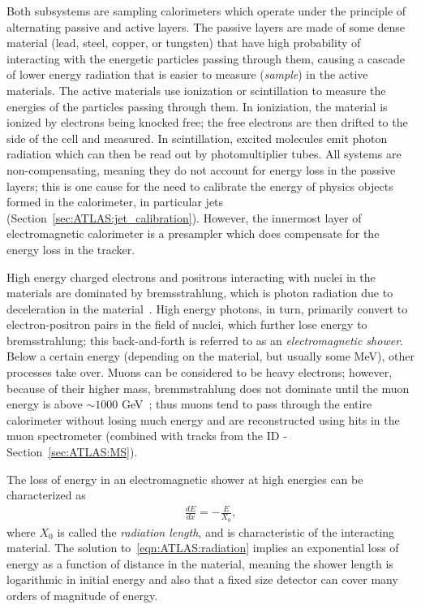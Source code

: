 Both subsystems are sampling calorimeters which operate under the principle of alternating passive and active layers.
The passive layers are made of some dense material (lead, steel, copper, or tungsten) that have high probability of interacting with the energetic particles passing through them, causing a cascade of lower energy radiation that is easier to measure (\textit{sample}) in the active materials.
The active materials use ionization or scintillation to measure the energies of the particles passing through them.
In ioniziation, the material is ionized by electrons being knocked free; the free electrons are then drifted to the side of the cell and measured.
In scintillation, excited molecules emit photon radiation which can then be read out by photomultiplier tubes.
All systems are non-compensating, meaning they do not account for energy loss in the passive layers; this is one cause for the need to calibrate the energy of physics objects formed in the calorimeter, in particular jets (Section~\ref{sec:ATLAS:jet_calibration}).
However, the innermost layer of electromagnetic calorimeter is a presampler which does compensate for the energy loss in the tracker.

High energy charged electrons and positrons interacting with nuclei in the materials are dominated by bremsstrahlung, which is photon radiation due to deceleration in the material~\cite{Lechner:2674116}.
High energy photons, in turn, primarily convert to electron-positron pairs in the field of nuclei, which further lose energy to bremsstrahlung; this back-and-forth is referred to as an \textit{electromagnetic shower}.
Below a certain energy (depending on the material, but usually some MeV), other processes take over.
Muons can be considered to be heavy electrons; however, because of their higher mass, bremmstrahlung does not dominate until the muon energy is above $\sim 1000$ GeV~\cite{TASI_day3_school}; thus muons tend to pass through the entire calorimeter without losing much energy and are reconstructed using hits in the muon spectrometer (combined with tracks from the ID - Section~\ref{sec:ATLAS:MS}).

The loss of energy in an electromagnetic shower at high energies can be characterized as
\begin{align}
\frac{dE}{dx} = -\frac{E}{X_0},
\label{eqn:ATLAS:radiation}
\end{align}
where $X_0$ is called the \textit{radiation length}, and is characteristic of the interacting material. 
The solution to~\ref{eqn:ATLAS:radiation} implies an exponential loss of energy as a function of distance in the material, meaning the shower length is logarithmic in initial energy and also that a fixed size detector can cover many orders of magnitude of energy.

